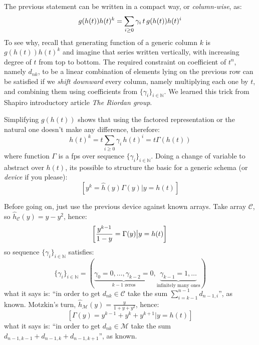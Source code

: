 The previous statement can be written in a compact way, or \emph{column-wise}, as:
\begin{displaymath}
    g(h(t))h(t)^k = \sum_{i\geq0}{\gamma_i\,t\,g(h(t)) h(t)^i}\\
\end{displaymath}
To see why, recall that generating function of a generic column 
$k$ is $g(h(t))h(t)^k$ and imagine that series written vertically, 
with increasing degree of $t$ from top to bottom.
The required constraint on coefficient of $t^n$, namely $d_{nk}$, 
to be a linear combination of elements lying on the previous row 
can be satisfied if we \emph{shift downward} every column,
namely multiplying each one by $t$, and combining them using coefficients
from $\lbrace \gamma_{i} \rbrace_{i\in\mathbb{N}}$. 
We learned this trick from Shapiro introductory article \emph{The Riordan group}.

Simplifying $g(h(t))$ shows that using the factored representation or
the natural one doesn't make any difference, therefore:
\begin{displaymath}
    h(t)^k = t \sum_{i\geq 0}{\gamma_i\,h(t)^i} = t \Gamma(h(t))
\end{displaymath}
where function $\Gamma$ is a fps over sequence 
$\lbrace \gamma_{i} \rbrace_{i\in\mathbb{N}}$.
Doing a change of variable to abstract over $h(t)$, its possible to
structure the basic for a generic schema (or \emph{device} if you please):
\begin{displaymath}
    \left[y^{k} = \hat{h}(y) \Gamma(y) \big| y = h(t) \right]
\end{displaymath}

Before going on, just use the previous device against known arrays. Take 
array $\mathcal{C}$, so $\hat{h}_{\mathcal{C}}(y) = y-y^2$, hence:
\begin{displaymath}
    \left[\frac{y^{k-1}}{1-y} =  \Gamma(y) \big| y = h(t) \right]\\
\end{displaymath}
so sequence $\lbrace \gamma_{i} \rbrace_{i\in\mathbb{N}}$ satisfies:
\begin{displaymath}
    \lbrace \gamma_{i} \rbrace_{i\in\mathbb{N}} = 
        \left(\underbrace{\gamma_{0}=0,\ldots,\gamma_{k-2}=0}_{k-1 \text{ zeros}},
            \underbrace{\gamma_{k-1}=1, \ldots}_{\text{infinitely many ones}} \right)
\end{displaymath}
what it says is: ``in order to get $d_{nk}\in\mathcal{C}$ take the sum 
$\sum_{i=k-1}^{n-1}{d_{n-1,i}}$'', as known. Motzkin's turn, 
$\hat{h}_{\mathcal{M}}(y) = \frac{y}{1+y+y^2}$, hence:
\begin{displaymath}
        \left[\Gamma(y)=y^{k-1}+y^{k}+y^{k+1}\big| y = h(t) \right]
\end{displaymath}
what it says is: ``in order to get $d_{nk}\in\mathcal{M}$ take the sum 
$d_{n-1,k-1}+d_{n-1,k}+d_{n-1,k+1}$'', as known.

